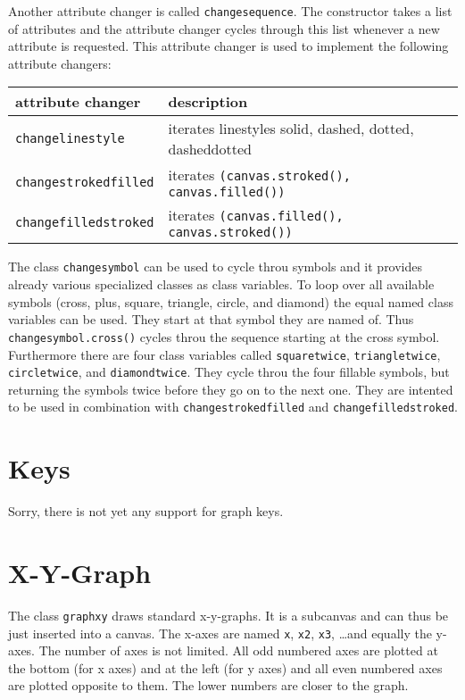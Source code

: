 Another attribute changer is called \verb|changesequence|. The
constructor takes a list of attributes and the attribute changer
cycles through this list whenever a new attribute is requested.
This attribute changer is used to implement the following attribute
changers:

\begin{center}
\begin{tabular}{ll}
attribute changer&description\\
\hline
\texttt{changelinestyle}&iterates linestyles solid, dashed, dotted, dasheddotted\\
\texttt{changestrokedfilled}&iterates \texttt{(canvas.stroked(), canvas.filled())}\\
\texttt{changefilledstroked}&iterates \texttt{(canvas.filled(), canvas.stroked())}\\
\end{tabular}
\end{center}

The class \verb|changesymbol| can be used to cycle throu symbols and it
provides already various specialized classes as class variables. To
loop over all available symbols (cross, plus, square, triangle,
circle, and diamond) the equal named class variables can be used. They
start at that symbol they are named of. Thus \verb|changesymbol.cross()|
cycles throu the sequence starting at the cross symbol. Furthermore
there are four class variables called \verb|squaretwice|,
\verb|triangletwice|, \verb|circletwice|, and \verb|diamondtwice|.
They cycle throu the four fillable symbols, but returning the symbols
twice before they go on to the next one. They are intented to be used
in combination with \verb|changestrokedfilled| and
\verb|changefilledstroked|.

\section{Keys}
Sorry, there is not yet any support for graph keys.

\section{X-Y-Graph}

The class \verb|graphxy| draws standard x-y-graphs. It is a subcanvas
and can thus be just inserted into a canvas. The x-axes are named
\verb|x|, \verb|x2|, \verb|x3|, \dots and equally the y-axes. The
number of axes is not limited. All odd numbered axes are plotted at
the bottom (for x axes) and at the left (for y axes) and all even
numbered axes are plotted opposite to them. The lower numbers are
closer to the graph.

